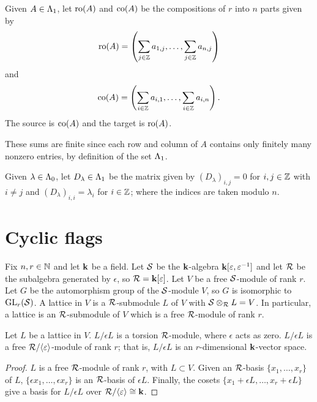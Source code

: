 \documentclass[a4paper, 11pt]{report}
\begin{document}
\begin{definition}\label{def:source-target}
Given $A\in\Lambda_1{}$, let $\operatorname{ro}(A)$ and $\operatorname{co}(A)$ be the compositions of $r$ into $n$ parts given by
\begin{equation*}
\operatorname{ro}(A) = \left( \sum_{j\in\mathbb{Z}}a_{1,j}, \ldots, \sum_{j\in\mathbb{Z}} a_{n,j}\right)
\end{equation*}
and
\begin{equation*}
\operatorname{co}(A) = \left( \sum_{i\in\mathbb{Z}} a_{i,1}, \ldots, \sum_{i\in\mathbb{Z}} a_{i,n}\right).
\end{equation*}
The source is $\operatorname{co}(A)$ and the target is $\operatorname{ro}(A)$.
\end{definition}

These sums are finite since each row and column of $A$ contains only finitely many nonzero entries, by definition of the set $\Lambda_1{}$.


\begin{definition}\label{def:diagonal-matrices}
Given $\lambda\in\Lambda_0{}$, let $D_\lambda\in\Lambda_1{}$ be the matrix given by $(D_\lambda)_{i,j}=0$ for $i,j\in\mathbb{Z}$ with $i\neq j$ and $(D_\lambda)_{i,i}=\lambda_i$ for $i\in\mathbb{Z}$; where the indices are taken modulo $n$.
\end{definition}

\section{Cyclic flags}

Fix $n,r\in\mathbb{N}$ and let $\mathbf{k}$ be a field. Let $\mathcal{S}$ be the $\mathbf{k}$-algebra $\mathbf{k}[\varepsilon,\varepsilon^{-1}]$ and let $\mathcal{R}$ be the subalgebra generated by $\epsilon$, so $\mathcal{R} = \mathbf{k}[\varepsilon]$. Let $V$ be a free $\mathcal{S}$-module of rank $r$. Let $G$ be the automorphism group of the $\mathcal{S}$-module $V$, so $G$ is isomorphic to $\operatorname{GL}_{r}(\mathcal{S})$. A lattice in $V$ is a $\mathcal{R}$-submodule $L$ of $V$ with $\mathcal{S}\otimes_{\mathcal{R}} L = V$. In particular, a lattice is an $\mathcal{R}$-submodule of $V$ which is a free $\mathcal{R}$-module of rank $r$.

\begin{lemma}
Let $L$ be a lattice in $V$. $L/{\epsilon L}$ is a torsion $\mathcal{R}$-module, where $\epsilon$ acts as zero. $L/{\epsilon L}$ is a free $\mathcal{R}/{\langle \varepsilon \rangle}$-module of rank $r$; that is, $L/{\epsilon L}$ is an $r$-dimensional $\mathbf{k}$-vector space.
\end{lemma}
\begin{proof}
$L$ is a free $\mathcal{R}$-module of rank $r$, with $L\subset V$. Given an $\mathcal{R}$-basis $\{x_1,\ldots,x_r\}$ of $L$, $\{\epsilon x_1,\ldots, \epsilon x_r\}$ is an $\mathcal{R}$-basis of $\epsilon L$. Finally, the cosets $\{ x_1 + \epsilon L,\ldots, x_r + \epsilon L\}$ give a basis for $L/{\epsilon L}$ over $\mathcal{R}/{\langle \varepsilon\rangle}\cong \mathbf{k}$.
\end{proof}
\end{document}
